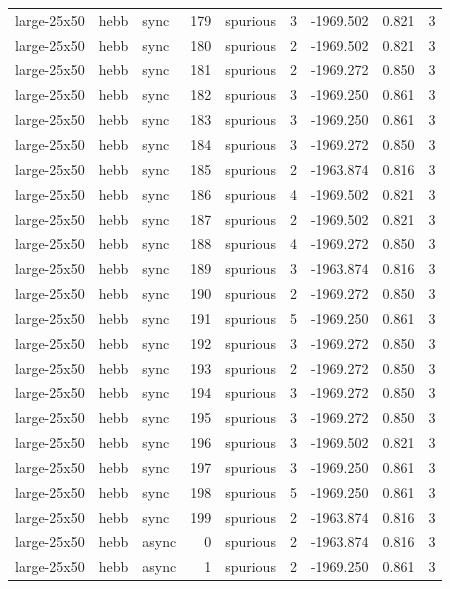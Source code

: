 \begin{tabular}{lllrlrrrr}
large-25x50 & hebb & sync & 179 & spurious & 3 & -1969.502 & 0.821 & 3 \\
large-25x50 & hebb & sync & 180 & spurious & 2 & -1969.502 & 0.821 & 3 \\
large-25x50 & hebb & sync & 181 & spurious & 2 & -1969.272 & 0.850 & 3 \\
large-25x50 & hebb & sync & 182 & spurious & 3 & -1969.250 & 0.861 & 3 \\
large-25x50 & hebb & sync & 183 & spurious & 3 & -1969.250 & 0.861 & 3 \\
large-25x50 & hebb & sync & 184 & spurious & 3 & -1969.272 & 0.850 & 3 \\
large-25x50 & hebb & sync & 185 & spurious & 2 & -1963.874 & 0.816 & 3 \\
large-25x50 & hebb & sync & 186 & spurious & 4 & -1969.502 & 0.821 & 3 \\
large-25x50 & hebb & sync & 187 & spurious & 2 & -1969.502 & 0.821 & 3 \\
large-25x50 & hebb & sync & 188 & spurious & 4 & -1969.272 & 0.850 & 3 \\
large-25x50 & hebb & sync & 189 & spurious & 3 & -1963.874 & 0.816 & 3 \\
large-25x50 & hebb & sync & 190 & spurious & 2 & -1969.272 & 0.850 & 3 \\
large-25x50 & hebb & sync & 191 & spurious & 5 & -1969.250 & 0.861 & 3 \\
large-25x50 & hebb & sync & 192 & spurious & 3 & -1969.272 & 0.850 & 3 \\
large-25x50 & hebb & sync & 193 & spurious & 2 & -1969.272 & 0.850 & 3 \\
large-25x50 & hebb & sync & 194 & spurious & 3 & -1969.272 & 0.850 & 3 \\
large-25x50 & hebb & sync & 195 & spurious & 3 & -1969.272 & 0.850 & 3 \\
large-25x50 & hebb & sync & 196 & spurious & 3 & -1969.502 & 0.821 & 3 \\
large-25x50 & hebb & sync & 197 & spurious & 3 & -1969.250 & 0.861 & 3 \\
large-25x50 & hebb & sync & 198 & spurious & 5 & -1969.250 & 0.861 & 3 \\
large-25x50 & hebb & sync & 199 & spurious & 2 & -1963.874 & 0.816 & 3 \\
large-25x50 & hebb & async & 0 & spurious & 2 & -1963.874 & 0.816 & 3 \\
large-25x50 & hebb & async & 1 & spurious & 2 & -1969.250 & 0.861 & 3 \\

\end{tabular}
